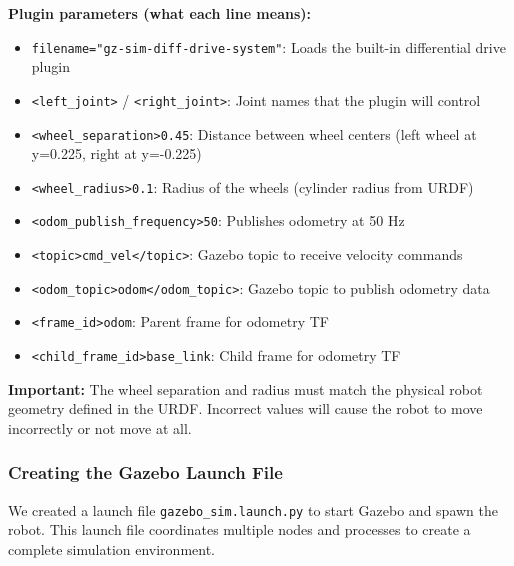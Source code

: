 \textbf{Plugin parameters (what each line means):}
\begin{itemize}
	\item \texttt{filename="gz-sim-diff-drive-system"}: Loads the built-in differential drive plugin
	\item \texttt{<left\_joint>} / \texttt{<right\_joint>}: Joint names that the plugin will control
	\item \texttt{<wheel\_separation>0.45}: Distance between wheel centers (left wheel at y=0.225, right at y=-0.225)
	\item \texttt{<wheel\_radius>0.1}: Radius of the wheels (cylinder radius from URDF)
	\item \texttt{<odom\_publish\_frequency>50}: Publishes odometry at 50 Hz
	\item \texttt{<topic>cmd\_vel</topic>}: Gazebo topic to receive velocity commands
	\item \texttt{<odom\_topic>odom</odom\_topic>}: Gazebo topic to publish odometry data
	\item \texttt{<frame\_id>odom}: Parent frame for odometry TF
	\item \texttt{<child\_frame\_id>base\_link}: Child frame for odometry TF
\end{itemize}

\textbf{Important:} The wheel separation and radius must match the physical robot geometry defined in the URDF. Incorrect values will cause the robot to move incorrectly or not move at all.

\subsubsection{Creating the Gazebo Launch File}

We created a launch file \texttt{gazebo\_sim.launch.py} to start Gazebo and spawn the robot. This launch file coordinates multiple nodes and processes to create a complete simulation environment.

